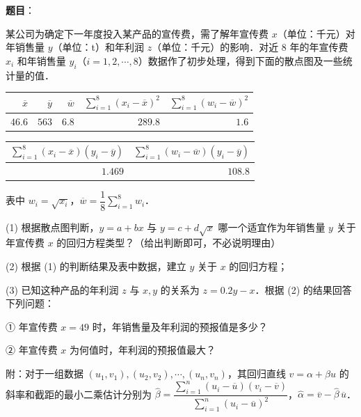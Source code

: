 \begin{answer}

\textbf{题目}：

某公司为确定下一年度投入某产品的宣传费，需了解年宣传费 $x$（单位：千元）对年销售量 $y$（单位：t）和年利润 $z$（单位：千元）的影响．对近 $8$ 年的年宣传费 $x_i$ 和年销售量 $y_i$（$i=1,2,\cdots,8$）数据作了初步处理，得到下面的散点图及一些统计量的值．
\nopagebreak[4]
\begin{center}\end{center}
\nopagebreak[4]
\begin{center}
\begin{tabular}{rrrrr}
\toprule
$\overline x$ & $\overline y$ & $\overline w$ & $\sum_{i=1}^{8}(x_i-\overline x)^2$ & $\sum_{i=1}^{8}(w_i-\overline w)^2$ \\
\midrule
$46.6$ & $563$ & $6.8$ & $289.8$ & $1.6$ \\
\bottomrule
\end{tabular}
\end{center}

\begin{center}
\begin{tabular}{rr}
\toprule
$\sum_{i=1}^{8}(x_i-\overline x)(y_i-\overline y)$ & $\sum_{i=1}^{8}(w_i-\overline w)(y_i-\overline y)$ \\
\midrule
$1.469$ & $108.8$ \\
\bottomrule
\end{tabular}
\end{center}

表中 $w_i=\sqrt{x_i}$，$\overline w=\dfrac18\sum_{i=1}^{8}w_i$．

(1) 根据散点图判断，$y=a+bx$ 与 $y=c+d\sqrt x$ 哪一个适宜作为年销售量 $y$ 关于年宣传费 $x$ 的回归方程类型？（给出判断即可，不必说明理由）

(2) 根据 (1) 的判断结果及表中数据，建立 $y$ 关于 $x$ 的回归方程；

(3) 已知这种产品的年利润 $z$ 与 $x,y$ 的关系为 $z=0.2y-x$．根据 (2) 的结果回答下列问题：

① 年宣传费 $x=49$ 时，年销售量及年利润的预报值是多少？

② 年宣传费 $x$ 为何值时，年利润的预报值最大？

附：对于一组数据 $(u_1,v_1),(u_2,v_2),\cdots,(u_n,v_n)$，其回归直线 $v=\alpha+\beta u$ 的斜率和截距的最小二乘估计分别为 $\widehat\beta=\dfrac{\sum_{i=1}^{n}(u_i-\overline u)(v_i-\overline v)}{\sum_{i=1}^{n}(u_i-\overline u)^2}$，$\widehat\alpha=\overline v-\widehat\beta\,\overline u$．


\end{answer}
